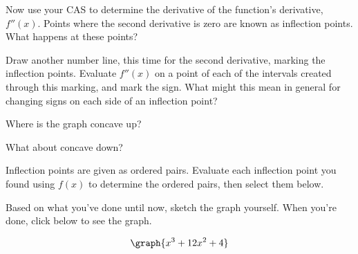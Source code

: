 \documentclass{ximera}
\begin{document}
\begin{question}

Now use your CAS to determine the derivative of the function's derivative, $f''(x)$. Points where the second derivative is zero are known as inflection points. What happens at these points?

\begin{multipleChoice}
\end{multipleChoice}

Draw another number line, this time for the second derivative, marking the inflection points. Evaluate $f''(x)$ on a point of each of the intervals created through this marking, and mark the sign. What might this mean in general for changing signs on each side of an inflection point?

\begin{selectAll}
\end{selectAll}

Where is the graph concave up?
\begin{multipleChoice}
\choice{$[0,1]$}
\choice[correct]{$[-4, \infty)$}
\choice{$(-\infty, 0]$}
\choice{$[0,260]$}
\choice{$[4,260]$}
\end{multipleChoice}

What about concave down?

\begin{multipleChoice}
\choice{$[0,1]$}
\choice{$[-4, \infty)$}
\choice[correct]{$(-\infty, -4]$}
\choice{$[0,260]$}
\choice{$[4,260]$}
\end{multipleChoice}

Inflection points are given as ordered pairs. Evaluate each inflection point you found using $f(x)$ to determine the ordered pairs, then select them below.
\begin{selectAll}
\end{selectAll}

Based on what you've done until now, sketch the graph yourself. When you're done, click below to see the graph.

\begin{multipleChoice}
\end{multipleChoice}
\begin{feedback}
\[
\graph{x^3+12x^2+4}
\]
\end{feedback}
\end{question}
\end{document}

